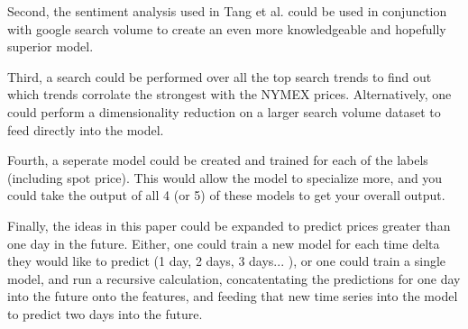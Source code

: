 \documentclass[final]{cvpr}
\begin{document}
    Second, the sentiment analysis used in Tang et al. could be used in 
    conjunction with google search volume to create an even more knowledgeable
    and hopefully superior model.

    Third, a search could be performed over all the top search trends to find 
    out which trends corrolate the strongest with the NYMEX prices. 
    Alternatively, one could perform a dimensionality reduction on a larger
    search volume dataset to feed directly into the model.

    Fourth, a seperate model could be created and trained for each of the labels
    (including spot price). This would allow the model to specialize more, and
    you could take the output of all 4 (or 5) of these models to get your 
    overall output.

    Finally, the ideas in this paper could be expanded to predict prices greater
    than one day in the future. Either, one could train a new model for each 
    time delta they would like to predict (1 day, 2 days, 3 days... ), or one
    could train a single model, and run a recursive calculation, concatentating
    the predictions for one day into the future onto the features, and feeding 
    that new time series into the model to predict two days into the future.

{\small
    
    
}
\end{document}
